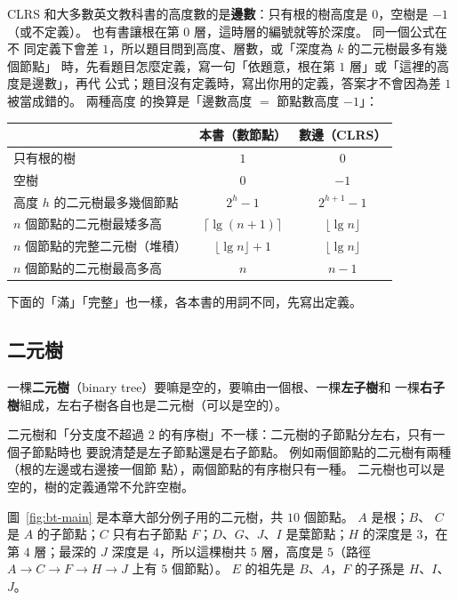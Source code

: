 \begin{examnote}
CLRS 和大多數英文教科書的高度數的是\textbf{邊數}：只有根的樹高度是 $0$，空樹是
$-1$（或不定義）。 也有書讓根在第 $0$ 層，這時層的編號就等於深度。 同一個公式在不
同定義下會差 $1$，所以題目問到高度、層數，或「深度為 $k$ 的二元樹最多有幾個節點」
時，先看題目怎麼定義，寫一句「依題意，根在第 $1$ 層」或「這裡的高度是邊數」，再代
公式；題目沒有定義時，寫出你用的定義，答案才不會因為差 $1$ 被當成錯的。 兩種高度
的換算是「邊數高度 $=$ 節點數高度 $- 1$」：

\begin{center}
\begin{tabular}{lcc}
\toprule
 & 本書（數節點） & 數邊（CLRS） \\
\midrule
只有根的樹 & $1$ & $0$ \\
空樹 & $0$ & $-1$ \\
高度 $h$ 的二元樹最多幾個節點 & $2^h - 1$ & $2^{h+1} - 1$ \\
$n$ 個節點的二元樹最矮多高 & $\lceil \lg(n + 1) \rceil$ & $\lfloor \lg n \rfloor$ \\
$n$ 個節點的完整二元樹（堆積） & $\lfloor \lg n \rfloor + 1$ & $\lfloor \lg n \rfloor$ \\
$n$ 個節點的二元樹最高多高 & $n$ & $n - 1$ \\
\bottomrule
\end{tabular}
\end{center}

下面的「滿」「完整」也一樣，各本書的用詞不同，先寫出定義。
\end{examnote}

\subsection{二元樹}

\begin{definition}[二元樹]
\label{def:bt-binary-tree}
一棵\textbf{二元樹}（binary tree）要嘛是空的，要嘛由一個根、一棵\textbf{左子樹}和
一棵\textbf{右子樹}組成，左右子樹各自也是二元樹（可以是空的）。
\end{definition}

二元樹和「分支度不超過 $2$ 的有序樹」不一樣：二元樹的子節點分左右，只有一個子節點時也
要說清楚是左子節點還是右子節點。 例如兩個節點的二元樹有兩種（根的左邊或右邊接一個節
點），兩個節點的有序樹只有一種。 二元樹也可以是空的，樹的定義通常不允許空樹。

圖~\ref{fig:bt-main} 是本章大部分例子用的二元樹，共 $10$ 個節點。 $A$ 是根；$B$、
$C$ 是 $A$ 的子節點；$C$ 只有右子節點 $F$；$D$、$G$、$J$、$I$ 是葉節點；$H$ 的深度是
$3$，在第 $4$ 層；最深的 $J$ 深度是 $4$，所以這棵樹共 $5$ 層，高度是 $5$（路徑
$A \to C \to F \to H \to J$ 上有 $5$ 個節點）。 $E$ 的祖先是
$B$、$A$，$F$ 的子孫是 $H$、$I$、$J$。

